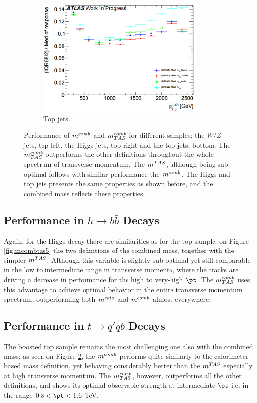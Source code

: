 \begin{figure}
    \begin{subfigure}[b]{0.45\textwidth}
  \centering
      \includegraphics[width=0.9\textwidth]{jet_part/mcomb/mcombtas4.png}
  \caption[$\mcombtas$ on the boosted tops]{Top jets.}
  \label{fig:mcombtas4}
    \end{subfigure}
\caption{Performance of $m^{comb}$ and $\mcombtas$ for different samples: the $W/Z$ jets, top left, the Higgs jets, top right and the top jets, bottom. The $\mcombtas$ outperforms the other definitions throughout the whole spectrum of transverse momentum. The $m^{TAS}$, although being sub-optimal follows with similar performance the $m^{comb}$. The Higgs and top jets presents the same properties as shown before, and the combined mass reflects these properties. }
\end{figure}

\subsection{Performance in $h\to b\bar{b}$ Decays}
Again, for the Higgs decay there are similarities as for the top sample; on Figure \ref{fig:mcombtas5} the two definitions of the combined mass, together with the simpler $m^{TAS}$. Although this variable is slightly sub-optimal yet still comparable in the low to intermediate range in transverse momenta, where the tracks are driving a decrease in performance for the high to very-high $\pt$. The $\mcombtas$ uses this advantage to achieve optimal behavior in the entire transverse momentum spectrum, outperforming both $m^{calo}$ and $m^{comb}$ almost everywhere.


\subsection{Performance in $t\to q'\bar{q}b$ Decays}
The boosted top sample remains the most challenging one also with the combined mass; as seen on Figure \ref{fig:mcombtas4}, the $m^{comb}$ performs quite similarly to the calorimeter based mass definition, yet behaving considerably better than the $m^{TAS}$ especially at high transverse momentum. The $\mcombtas$, however, outperforms all the other definitions, and shows its optimal observable strength at intermediate $\pt$ i.e. in the range $0.8 < \pt < 1.6$ TeV.

